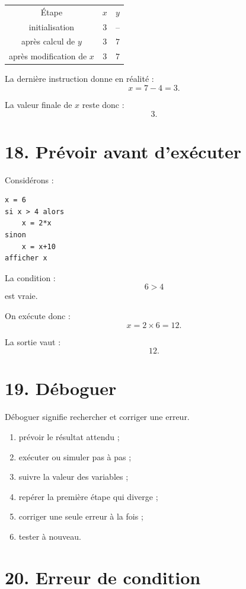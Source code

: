 \begin{tabular}{c|c|c}
Étape & $x$ & $y$ \\
initialisation & $3$ & -- \\
après calcul de $y$ & $3$ & $7$ \\
après modification de $x$ & $3$ & $7$ \\
\end{tabular}

La dernière instruction donne en réalité :
\[
x=7-4=3.
\]

La valeur finale de $x$ reste donc :
\[
3.
\]

\section{18. Prévoir avant d'exécuter}

Considérons :
\begin{verbatim}
x = 6
si x > 4 alors
    x = 2*x
sinon
    x = x+10
afficher x
\end{verbatim}

La condition :
\[
6>4
\]
est vraie.

On exécute donc :
\[
x=2\times6=12.
\]

La sortie vaut :
\[
\boxed{12}.
\]

\section{19. Déboguer}

Déboguer signifie rechercher et corriger une erreur.

\begin{methode}
\begin{enumerate}
\item prévoir le résultat attendu ;
\item exécuter ou simuler pas à pas ;
\item suivre la valeur des variables ;
\item repérer la première étape qui diverge ;
\item corriger une seule erreur à la fois ;
\item tester à nouveau.
\end{enumerate}
\end{methode}

\section{20. Erreur de condition}

